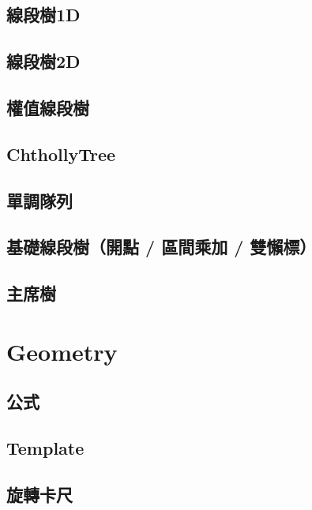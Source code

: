     \subsection{線段樹1D}
         \columnbreak
    \subsection{線段樹2D}
         \columnbreak
    \subsection{權值線段樹}
         \columnbreak
    \subsection{ChthollyTree}
         
    \subsection{單調隊列}
         \columnbreak
    \subsection{基礎線段樹（開點 / 區間乘加 / 雙懶標）}
         \columnbreak
    \subsection{主席樹}
        
\clearpage
        
\section{Geometry}
    \subsection{公式}
        
    \subsection{Template}
        
    \subsection{旋轉卡尺}
        
